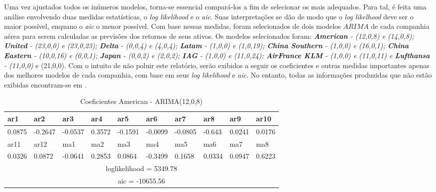 \documentclass[12pt]{article}
\begin{document}
Uma vez ajustados todos os inúmeros modelos, torna-se essencial compará-los a fim de selecionar os mais adequados. Para tal, é feita uma análise envolvendo duas medidas estatísticas, o \textit{log likelihood} e o \textit{aic}. Suas interpretações se dão de modo que o \textit{log likelhood} deve ser o maior possível, enquano o \textit{aic} o menor possível. Com base nessas medidas, foram selecionados de dois modelos $ARIMA$ de cada companhia aérea para serem calculadas as previsões dos retornos de seus ativos. Os modelos selecionados foram: \emph{\textbf{American} - (12,0,8) e (14,0,8); \textbf{United} - (23,0,0) e (23,0,23); \textbf{Delta} - (0,0,4) e (4,0,4); \textbf{Latam} - (1,0,0) e (1,0,19); \textbf{China Southern} - (1,0,0) e (16,0,1); \textbf{China Eastern} - (10,0,16) e (0,0,1); \textbf{Japan} - (0,0,2) e (2,0,2); \textbf{IAG} - (1,0,0) e (11,0,24); \textbf{AirFrance KLM} - (1,0,0) e (11,0,11) e \textbf{Lufthansa} - (11,0,0)} e (21,0,0). Com o intuito de não poluir este relatório, serão exibidos a seguir os coeficientes e outras medidas importantes apenas dos melhores modelos de cada companhia, com base em seus \textit{log likelihood} e \textit{aic}. No entanto, todas as informações produzidas que não estão exibidas encontram-se em \cite{git}.

\begin{table}[H]
\centering
\begin{tabular}{|l|l|l|l|l|l|l|l|l|l|}
\hline
ar1    & ar2     & ar3     & ar4    & ar5     & ar6     & ar7     & ar8    & ar9    & ar10   \\ \hline
0.0875 & -0.2647 & -0.0537 & 0.3572 & -0.1591 & -0.0099 & -0.0805 & -0.643 & 0.0241 & 0.0176 \\ \hline
ar11   & ar12    & ma1     & ma2    & ma3     & ma4     & ma5     & ma6    & ma7    & ma8    \\ \hline
0.0326 & 0.0872  & -0.0641 & 0.2853 & 0.0864  & -0.3499 & 0.1658  & 0.0334 & 0.0947 & 0.6223 \\ \hline
\multicolumn{10}{|c|}{loglikelihood = 5349.78}                                               \\ \hline
\multicolumn{10}{|c|}{aic = -10655.56}                                                       \\ \hline 
\end{tabular}
\caption{Coeficientes American - ARIMA(12,0,8)}
\label{tab:American1208}
\end{table}
\end{document}
